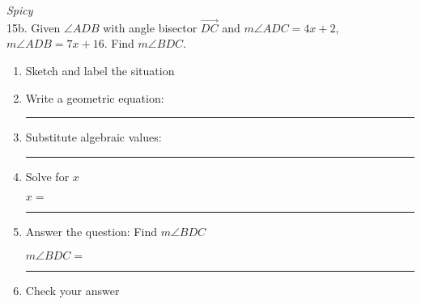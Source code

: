 \documentclass[12pt, twoside]{article}
\begin{document}
    \newpage
    \setcounter{page}{5}
      \emph{Spicy}\\
      15b. Given $\angle ADB$ with angle bisector $\overrightarrow{DC}$ and $m\angle ADC = 4x+2$, $m\angle ADB = 7x+16$. Find $m\angle BDC$.  %
      \begin{enumerate}
        \item Sketch and label the situation
        \begin{flushright}
        \end{flushright}
        \vspace{.5cm}

        \item Write a geometric equation: \rule{5cm}{0.15mm} \vspace{1cm}
        \item Substitute algebraic values: \rule{5cm}{0.15mm}
        \item Solve for $x$
        \vspace{4cm}
        \begin{center} $x=$ \rule{1cm}{0.15mm} \end{center}
        \item Answer the question: Find $m\angle BDC$ %
        \vspace{2cm}
        \begin{center} $m\angle BDC=$ \rule{1cm}{0.15mm} \end{center}
        \item Check your answer
      \end{enumerate}
      \vspace{2cm}
\end{document}
